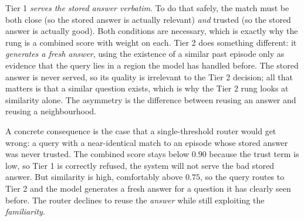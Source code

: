 \begin{precise}
Tier 1 \emph{serves the stored answer verbatim}. To do that safely, the match must
be both close (so the stored answer is actually relevant) \emph{and} trusted (so the
stored answer is actually good). Both conditions are necessary, which is exactly why
the rung is a combined score with weight on each. Tier 2 does something different: it
\emph{generates a fresh answer}, using the existence of a similar past episode only
as evidence that the query lies in a region the model has handled before. The stored
answer is never served, so its quality is irrelevant to the Tier 2 decision; all that
matters is that a similar question exists, which is why the Tier 2 rung looks at
similarity alone. The asymmetry is the difference between reusing an answer and
reusing a neighbourhood.
\end{precise}

A concrete consequence is the case that a single-threshold router would get wrong: a
query with a near-identical match to an episode whose stored answer was never trusted.
The combined score stays below $0.90$ because the trust term is low, so Tier 1 is
correctly refused, the system will not serve the bad stored answer. But similarity is
high, comfortably above $0.75$, so the query routes to Tier 2 and the model generates a
fresh answer for a question it has clearly seen before. The router declines to reuse the
\emph{answer} while still exploiting the \emph{familiarity}.


